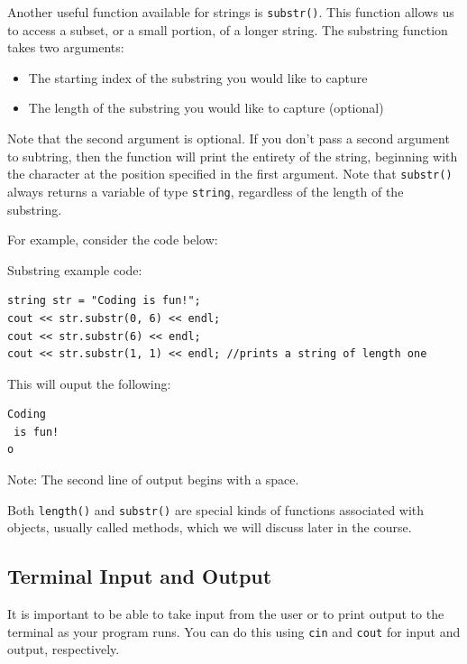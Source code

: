 Another useful function available for strings is \texttt{substr()}. This function allows us to access a subset, or a small portion, of a longer string. The substring function takes two arguments:

\begin{itemize}
    \item The starting index of the substring you would like to capture
    \item The length of the substring you would like to capture (optional)
\end{itemize}

Note that the second argument is optional. If you don't pass a second argument to subtring, then the function will print the entirety of the string, beginning with the character at the position specified in the first argument. Note that \texttt{substr()} always returns a variable of type \texttt{string}, regardless of the length of the substring.

For example, consider the code below:

\begin{example}
    Substring example code:

\begin{verbatim}
string str = "Coding is fun!";
cout << str.substr(0, 6) << endl;
cout << str.substr(6) << endl;
cout << str.substr(1, 1) << endl; //prints a string of length one
\end{verbatim}
\end{example}

This will ouput the following:

\begin{verbatim}
Coding
 is fun!
o
\end{verbatim}


Note: The second line of output begins with a space.

Both \texttt{length()} and \texttt{substr()} are special kinds of functions associated with objects, usually called methods, which we will discuss later in the course.

\subsection{Terminal Input and Output}

It is important to be able to take input from the user or to print output to the terminal as your program runs. You can do this using \texttt{cin} and \texttt{cout} for input and output, respectively. 

